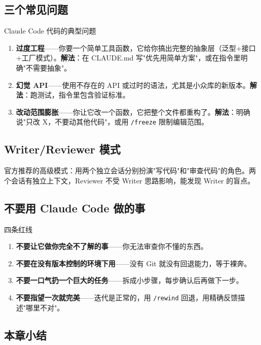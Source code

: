\documentclass[a4paper]{article}
\begin{document}
\subsection{三个常见问题}

\begin{warningbox}{Claude Code 代码的典型问题}
\begin{enumerate}[leftmargin=1.5em]
  \item \textbf{过度工程}——你要一个简单工具函数，它给你搞出完整的抽象层（泛型+接口+工厂模式）。\textbf{解法}：在 CLAUDE.md 写"优先用简单方案"，或在指令里明确"不需要抽象"。
  \item \textbf{幻觉 API}——使用不存在的 API 或过时的语法，尤其是小众库的新版本。\textbf{解法}：跑测试，指令里包含验证标准。
  \item \textbf{改动范围膨胀}——你让它改一个函数，它把整个文件都重构了。\textbf{解法}：明确说"只改 X，不要动其他代码"，或用 \texttt{/freeze} 限制编辑范围。
\end{enumerate}
\end{warningbox}

\subsection{Writer/Reviewer 模式}

官方推荐的高级模式：用两个独立会话分别扮演"写代码"和"审查代码"的角色。两个会话有独立上下文，Reviewer 不受 Writer 思路影响，能发现 Writer 的盲点。

\subsection{不要用 Claude Code 做的事}

\begin{warningbox}{四条红线}
\begin{enumerate}[leftmargin=1.5em]
  \item \textbf{不要让它做你完全不了解的事}——你无法审查你不懂的东西。
  \item \textbf{不要在没有版本控制的环境下用}——没有 Git 就没有回退能力，等于裸奔。
  \item \textbf{不要一口气扔一个巨大的任务}——拆成小步骤，每步确认后再做下一步。
  \item \textbf{不要指望一次就完美}——迭代是正常的，用 \texttt{/rewind} 回退，用精确反馈描述"哪里不对"。
\end{enumerate}
\end{warningbox}

\subsection{本章小结}
\end{document}
